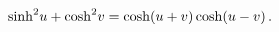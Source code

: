 \[{\mathop{\sinh\/}\nolimits^{2}}u+{\mathop{\cosh\/}\nolimits^{2}}v=\mathop{%
\cosh\/}\nolimits\!\left(u+v\right)\mathop{\cosh\/}\nolimits\!\left(u-v\right).\]